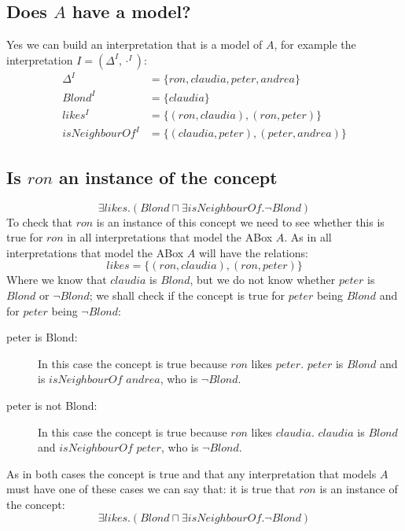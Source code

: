\documentclass[a4paper,12pt]{article}
\begin{document}
\subsection[Model]{Does $A$ have a model?}
\label{roninterpretation}
Yes we can build an interpretation that is a model of $A$, for example the
interpretation $ I = (\Delta^I, \cdot^I) $:
\begin{align*}
       \Delta^I &= \{ron, claudia, peter, andrea\}\\
        Blond^I &= \{claudia\}\\
        likes^I &= \{(ron,claudia),(ron,peter)\}\\
isNeighbourOf^I &= \{(claudia,peter),(peter,andrea)\}
\end{align*}

\subsection[Exists]{Is $ron$ an instance of the concept}
\begin{equation*}
\exists likes.(Blond \sqcap \exists isNeighbourOf. \neg Blond)
\end{equation*}
To check that $ron$ is an instance of this concept we need to see whether this
is true for $ron$ in all interpretations that model the ABox $A$.  As in all
interpretations that model the ABox $A$ will have the relations:
\begin{equation*}
likes = \{(ron,claudia),(ron,peter)\}
\end{equation*}
Where we know that $claudia$ is $Blond$, but we do not know whether $peter$ is
$Blond$ or $\neg Blond$; we shall check if the concept is true for $peter$
being $Blond$ and for $peter$ being $\neg Blond$:
\begin{description}
\item[peter is Blond:] In this case the concept is true because $ron$ likes
$peter$.  $peter$ is $Blond$ and is $isNeighbourOf$ $andrea$, who is $\neg
Blond$.

\item[peter is not Blond:] In this case the concept is true because $ron$ likes
$claudia$.  $claudia$ is $Blond$ and $isNeighbourOf$ $peter$, who is $\neg
Blond$.
\end{description}

As in both cases the concept is true and that any interpretation that models
$A$ must have one of these cases we can say that: it is true that $ron$ is an
instance of the concept:
\begin{equation*}
\exists likes.(Blond \sqcap \exists isNeighbourOf. \neg Blond)
\end{equation*}
\end{document}
